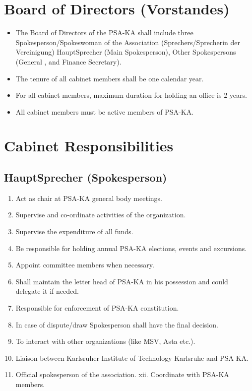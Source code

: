 \section{Board of Directors (Vorstandes)  }
\begin{itemize}
	\item The Board of Directors of the PSA-KA shall include three Spokesperson/Spokeswoman of the Association (Sprechers/Sprecherin der Vereinigung) HauptSprecher (Main Spokesperson), Other Spokespersons (General , and Finance Secretary). 
	\item The tenure of all cabinet members shall be one calendar year. 
	\item For all cabinet members, maximum duration for holding an office is 2 years. 
	\item All cabinet members must be active members of PSA-KA. 
\end{itemize}
\section{Cabinet Responsibilities }
\subsection{HauptSprecher (Spokesperson) }
\begin{enumerate}
	\item Act as chair at PSA-KA general body meetings. 
	\item Supervise and co-ordinate activities of the organization. 
	\item Supervise the expenditure of all funds. 
	\item Be responsible for holding annual PSA-KA elections, events and excursions. 
	\item Appoint committee members when necessary. 
	\item Shall maintain the letter head of PSA-KA in his possession and could delegate it if needed. 
	\item Responsible for enforcement of PSA-KA constitution. 
	\item In case of dispute/draw Spokesperson shall have the final decision. 
	\item To interact with other organizations (like MSV, Asta etc.). 
	\item Liaison between Karlsruher Institute of Technology Karlsruhe and PSA-KA. 
	\item Official spokesperson of the association. xii. Coordinate with PSA-KA members. 
\end{enumerate}
